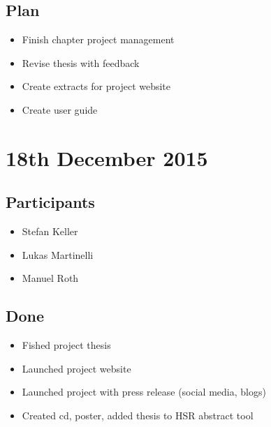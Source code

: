 \subsection*{Plan}

\begin{itemize}
  \item Finish chapter project management
  \item Revise thesis with feedback 
  \item Create extracts for project website
  \item Create user guide
\end{itemize}

\section*{18th December 2015}

\subsection*{Participants}

\begin{itemize}
  \item Stefan Keller
  \item Lukas Martinelli
  \item Manuel Roth
\end{itemize}

\subsection*{Done}

\begin{itemize}
  \item Fished project thesis
  \item Launched project website
  \item Launched project with press release (social media, blogs)
  \item Created cd, poster, added thesis to HSR abstract tool
\end{itemize}

\newpage{}